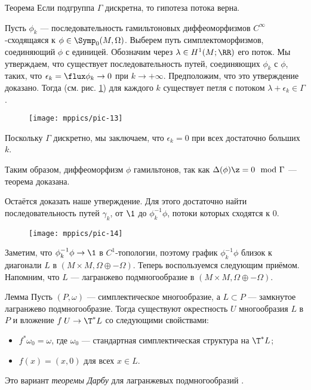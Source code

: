 \begin{thm}{Теорема}\label{14.2.A}
Если подгруппа $\Gamma$ дискретна, то гипотеза потока верна. 
\end{thm}

Пусть $\phi_k$ — последовательность гамильтоновых диффеоморфизмов $C^\infty$-сходящаяся к $\phi\in\Symp_0(M,\Omega)$.
Выберем путь симплектоморфизмов, соединяющий $\phi$ с единицей.
Обозначим через $\lambda \in H^1 (M;\RR)$ его поток.
Мы утверждаем, что существует последовательность путей, соединяющих $\phi_k$ с $\phi$, 
таких, что $\epsilon_k=\flux \phi_k\to 0$ при $k\to +\infty$.
Предположим, что это утверждение доказано.
Тогда (см. рис. \ref{pic-13}) для каждого $k$ существует петля с потоком $\lambda + \epsilon_k\in \Gamma$.
\begin{figure}[ht!]
\centering
\texttt{[image: mppics/pic-13]}
\caption{}\label{pic-13}
\vskip0mm
\end{figure}
Поскольку $\Gamma$ дискретно, мы заключаем, что $\epsilon_k=0$ при всех достаточно больших $k$.



Таким образом, диффеоморфизм $\phi$ гамильтонов, так как $\Delta(\phi) \z= 0 \mod{\Gamma}$  — теорема доказана.

Остаётся доказать наше утверждение.
Для этого достаточно найти последовательность путей $\gamma_k$, от
$\1$ до $\phi_k^{-1}\phi$, потоки которых сходятся к $0$.

\begin{figure}[ht!]
\centering
\texttt{[image: mppics/pic-14]}
\caption{}\label{pic-14}
\vskip0mm
\end{figure}

Заметим, что $\phi_k^{-1}\phi \to \1$ в $C^{1}$-топологии, поэтому график
$\phi_k^{-1}\phi$ близок к диагонали $L$ в $(M \times M, \Omega \oplus
-\Omega)$. 
Теперь воспользуемся следующим приёмом.
Напомним, что $L$ — лагранжево подмногообразие в $(M \times M,
\Omega \oplus -\Omega)$.

\begin{thm}{Лемма}
Пусть $(P, \omega)$ — симплектическое многообразие, а $L\subset P$
— замкнутое лагранжево подмногообразие. 
Тогда существуют окрестность $U$ многообразия $L$ в $P$ и вложение
$f\: U \to \T^\ast L$ со следующими свойствами: 
\begin{itemize}
\item $f^\ast\omega_0 = \omega$, где $\omega_0$ — стандартная симплектическая структура на $\T^\ast L$;
\item $f(x) = (x,0)$ для всех $x\in L$.
\end{itemize}
\end{thm}
Это вариант \emph{теоремы Дарбу} для лагранжевых
подмногообразий \cite{MS}. 

